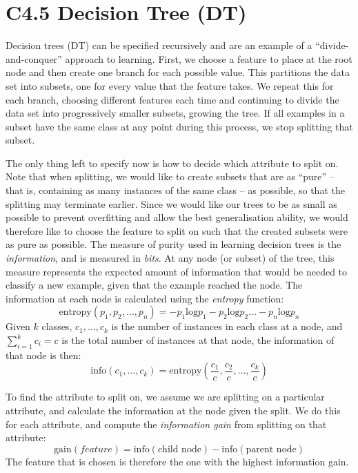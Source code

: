 \section{C4.5 Decision Tree (DT)}
Decision trees (DT) can be specified recursively and are an example of a
``divide-and-conquer'' approach to learning. First, we choose a feature to
place at the root node and then create one branch for each possible value.
This partitions the data set into subsets, one for every value that the
feature takes. We repeat this for each branch, choosing different features
each time and continuing to divide the data set into progressively smaller
subsets, growing the tree.
If all examples in a subset have the same class at any point during
this process, we stop splitting that subset.

The only thing left to specify
now is how to decide which attribute to split on. Note that when splitting,
we would like to create subsets that are as ``pure''
-- that is, containing as many
instances of the same class -- as possible, so that the splitting may
terminate earlier. Since we would like our trees to be as small as possible to
prevent overfitting and allow the best generalisation ability,
we would therefore like to choose the feature to split on such that the
created subsets were as pure as possible. The measure of purity used in
learning decision trees is the \textit{information}, and is measured in
\textit{bits}. At any node (or subset) of the tree, this measure represents
the expected amount of information that would be needed to classify a new
example, given that the example reached the node. The information at each
node is calculated using the \textit{entropy} function:
\begin{equation*}
\mathrm{entropy}(p_1,p_2,\ldots,p_n) = -p_1\mathrm{log}p_1 -p_2\mathrm{log}p_2 \ldots -p_n\mathrm{log}p_n
\end{equation*}
Given $k$ classes, $c_1,\ldots,c_k$ is the number of instances in each
class at a node, and $\sum_{i=1}^k c_i = c$ is the total number of instances
at that node, the information of that node is then:
\begin{equation*}
\mathrm{info}(c_1,\ldots,c_k) = \mathrm{entropy}\left(\frac{c_1}{c},\frac{c_2}{c},\ldots,\frac{c_k}{c}\right)
\end{equation*}

To find the attribute to split on, we assume we are splitting on a particular
attribute, and calculate the information at the node given the split. We do
this for each attribute, and compute the \textit{information gain} from
splitting on that attribute:
\begin{equation*}
\mathrm{gain}(feature) = \mathrm{info}(\text{child node}) - \mathrm{info}(\text{parent node})
\end{equation*}
The feature that is chosen is therefore the one with the highest information
gain.

